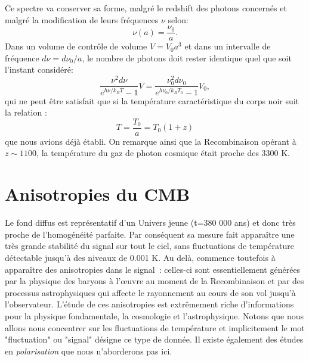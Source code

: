 Ce spectre va conserver sa forme, malgré le redshift des photons concernés et malgré la modification de leurs fréquences $\nu$ selon:
\begin{equation}
\nu(a)=\frac{\nu_0}{a}.
\end{equation}
Dans un volume de contrôle de volume $V=V_0a^3$ et dans un intervalle de fréquence $d\nu=d\nu_0/a$, le nombre de photons doit rester identique quel que soit l'instant considéré:
\begin{equation}
\frac{\nu^2d\nu}{e^{h\nu/k_BT}-1}V=\frac{\nu_0^2d\nu_0}{e^{h\nu_0/k_BT_0}-1}V_0,
\end{equation}
qui ne peut être satisfait que si la température caractéristique du corps noir suit la relation :
\begin{equation}
T=\frac{T_0}{a}=T_0(1+z)
\end{equation}
que nous avions déjà établi. On remarque ainsi que la Recombinaison opérant à $z\sim1100$, la température du gaz de photon cosmique était proche des 3300 K.

\section{Anisotropies du CMB}
Le fond diffus est représentatif d'un Univers jeune (t=380 000 ans) et donc très proche de l'homogénéité parfaite. Par conséquent sa mesure fait apparaître une très grande stabilité du signal sur tout le ciel, sans fluctuations de température détectable jusqu'à des niveaux de 0.001 K. Au delà, commence toutefois à apparaître des anisotropies dans le signal~: celles-ci sont essentiellement générées par la physique des baryons à l'œuvre au moment de la Recombinaison et par des processus astrophysiques qui affecte le rayonnement au cours de son vol jusqu'à l'observateur. L'étude de ces anisotropies est extrêmement riche d'informations pour la physique fondamentale, la cosmologie et l'astrophysique. Notons que nous allons nous concentrer sur les fluctuations de température et implicitement le mot "fluctuation" ou "signal" désigne ce type de donnée. Il existe également des études en \textit{polarisation} que nous n'aborderons pas ici.

